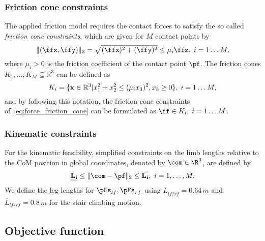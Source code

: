 \subsubsection*{Friction cone constraints}
The applied friction model requires the contact forces to satisfy the so called \textit{friction cone constraints}, which are given for $M$ contact points by
\begin{equation}
  \label{eq:force_friction_cone}
  \|(\ffx, \ffy)\|_2 =\sqrt{(\ffx)^2+ (\ffy)^2} \leq \mu_i \ffz, \; i=1\dots M,
\end{equation}
where $\mu_i>0 $ is the friction coefficient of the contact point $\pf$.
The friction cones $K_1, ..., K_M \subseteq \mathbb{R}^3$ can be defined as
\begin{equation*}
  K_i = \{ {\bf x} \in \mathbb{R}^3 | x^2_1 + x^2_2 \leq (\mu_i x_3)^2, x_3\geq0 \}, \; i= 1\dots M,
  \label{eq:cone_on_norm}
\end{equation*}
and by following this notation, the friction cone constraints of~\eqref{eq:force_friction_cone} can be formulated as
$ \ff \in K_i, \; i=1\dots M $.

\subsubsection*{Kinematic constraints}
For the kinematic feasibility, simplified constraints on the limb lengths relative to the CoM position in global coordinates, denoted by $\com\in\R^3$, are defined by
\begin{equation}
  \label{eq:kinematic_constraints}
   \underline{\bf L_i} \leq \lVert \com - \pf \rVert_2 \leq \overline{\bf L_i}, \ i = 1,\dots, M.
\end{equation}
We define the leg lengths for $\pFs_{lf}, \pFs_{rf}$ using $\underline{L}_{lf/rf} = 0.64\,m$ and $\overline{L}_{lf/rf} = 0.8\,m$ for the stair climbing motion.



\subsection{Objective function}\label{sec:cost}
\newcommand{\NOBJ}{4}

